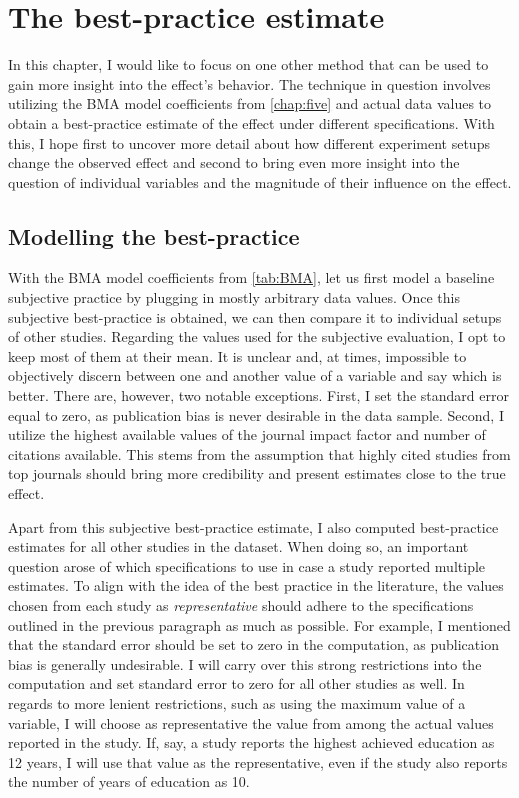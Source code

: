 \chapter{The best-practice estimate}
\label{chap:six}

In this chapter, I would like to focus on one other method that can be used to gain more insight into the effect's behavior. The technique in question involves utilizing the \ac{BMA} model coefficients from \autoref{chap:five} and actual data values to obtain a best-practice estimate of the effect under different specifications. With this, I hope first to uncover more detail about how different experiment setups change the observed effect and second to bring even more insight into the question of individual variables and the magnitude of their influence on the effect.


\section{Modelling the best-practice}
\label{sec:best_practice_base}

With the \ac{BMA} model coefficients from \autoref{tab:BMA}, let us first model a baseline subjective practice by plugging in mostly arbitrary data values. Once this subjective best-practice is obtained, we can then compare it to individual setups of other studies. Regarding the values used for the subjective evaluation, I opt to keep most of them at their mean. It is unclear and, at times, impossible to objectively discern between one and another value of a variable and say which is better. There are, however, two notable exceptions. First, I set the standard error equal to zero, as publication bias is never desirable in the data sample. Second, I utilize the highest available values of the journal impact factor and number of citations available. This stems from the assumption that highly cited studies from top journals should bring more credibility and present estimates close to the true effect.

Apart from this subjective best-practice estimate, I also computed best-practice estimates for all other studies in the dataset. When doing so, an important question arose of which specifications to use in case a study reported multiple estimates. To align with the idea of the best practice in the literature, the values chosen from each study as \textit{representative} should adhere to the specifications outlined in the previous paragraph as much as possible. For example, I mentioned that the standard error should be set to zero in the computation, as publication bias is generally undesirable. I will carry over this strong restrictions into the computation and set standard error to zero for all other studies as well. In regards to more lenient restrictions, such as using the maximum value of a variable, I will choose as representative the value from among the actual values reported in the study. If, say, a study reports the highest achieved education as 12 years, I will use that value as the representative, even if the study also reports the number of years of education as 10.

